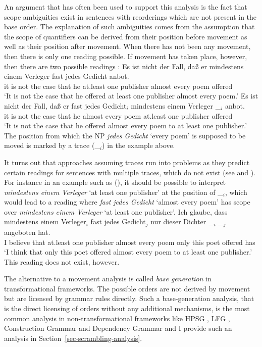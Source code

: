 An argument that has often been used to support this analysis is the fact that scope ambiguities
exist in sentences with reorderings which are not present in the base order. The explanation of such
ambiguities comes from the assumption that the scope of quantifiers
can be derived from their position before movement as well as their position after movement. When
there has not been any movement, then there is only one reading possible. If movement has taken
place, however, then there are two possible readings \citep[\page ]{Frey93a}:
\eal
\ex 
\gll Es ist nicht der Fall, daß er mindestens einem Verleger fast jedes Gedicht anbot.\\
     it is not the case that he at.least one publisher almost every poem offered\\
\glt `It is not the case that he offered at least one publisher almost every poem.'
\ex 
\gll Es ist nicht der Fall, daß er fast jedes Gedicht$_i$ mindestens einem Verleger \_$_i$ anbot.\\
	 it is not the case that he almost every poem at.least one publisher {} offered\\
\glt `It is not the case that he offered almost every poem to at least one publisher.'
\zl
The position from which the NP \emph{jedes Gedicht} `every poem' is supposed to be moved is marked
by a trace (\_$_i$) in the example above. 

It turns out that approaches assuming traces run into problems as they predict certain readings for sentences with multiple traces, which
do not exist (see \citealp[]{Kiss2001a} and \citealp[Section~2.6]{Fanselow2001a}). 
For instance in an example such as (), it should be possible to interpret \emph{mindestens einem Verleger} `at least one publisher' at
the position of \_$_i$, which would lead to a reading where \emph{fast jedes Gedicht} `almost every poem' has scope over \emph{mindestens einem Verleger} 
`at least one publisher'.
\ea
\gll Ich glaube, dass mindestens einem Verleger$_i$ fast jedes Gedicht$_j$ nur dieser Dichter \_$_i$ \_$_j$ angeboten hat.\\
	 I believe that at.least one publisher almost every poem only this poet {} {} offered has\\
\glt `I think that only this poet offered almost every poem to at least one publisher.'
\z
This reading does not exist, however.

The alternative to a movement analysis is called \emph{base generation} in
transformational frameworks. The possible orders are not derived by movement but are licensed by
grammar rules directly. Such a base-generation analysis, that is the direct licensing of orders without
any additional mechanisms, is the most common analysis in non-transformational frameworks like HPSG \citep{Pollard90a},
LFG \citep{Berman2003a}, Construction Grammar \citep{Micelli2012a} and Dependency Grammar \citep{Eroms2000a,GO2009a} and I provide such an analysis in Section~\ref{sec-scrambling-analysis}.

